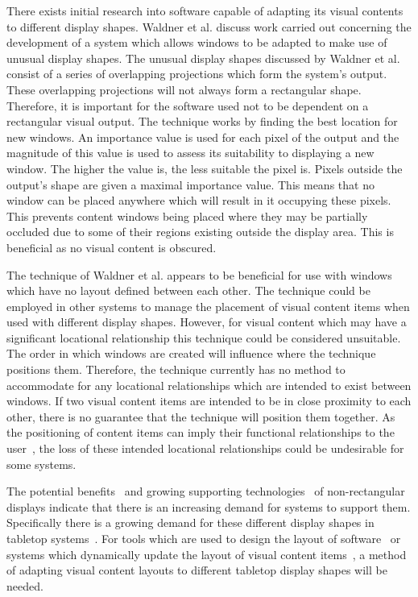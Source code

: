 \documentclass[review,5p,times,twocolumn]{elsarticle}
\begin{document}
There exists initial research into software capable of adapting its visual contents to different display shapes.
Waldner et al. \cite{Waldner2011} discuss work carried out concerning the development of a system which allows windows to be adapted to make use of unusual display shapes.
The unusual display shapes discussed by Waldner et al. consist of a series of overlapping projections which form the system's output.
These overlapping projections will not always form a rectangular shape.
Therefore, it is important for the software used not to be dependent on a rectangular visual output.
The technique works by finding the best location for new windows.
An importance value is used for each pixel of the output and the magnitude of this value is used to assess its suitability to displaying a new window.
The higher the value is, the less suitable the pixel is.
Pixels outside the output's shape are given a maximal importance value.
This means that no window can be placed anywhere which will result in it occupying these pixels.
This prevents content windows being placed where they may be partially occluded due to some of their regions existing outside the display area.
This is beneficial as no visual content is obscured.

The technique of Waldner et al. \cite{Waldner2011} appears to be beneficial for use with windows which have no layout defined between each other.
The technique could be employed in other systems to manage the placement of visual content items when used with different display shapes.
However, for visual content which may have a significant locational relationship this technique could be considered unsuitable.
The order in which windows are created will influence where the technique positions them.
Therefore, the technique currently has no method to accommodate for any locational relationships which are intended to exist between windows.
If two visual content items are intended to be in close proximity to each other, there is no guarantee that the technique will position them together.
As the positioning of content items can imply their functional relationships to the user~\cite{Constantine1999}, the loss of these intended locational relationships could be undesirable for some systems.

The potential benefits~\cite{Greenfield2006,Vernier2002} and growing supporting technologies~\cite{Boyd2007,Finney2009} of non-rectangular displays indicate that there is an increasing demand for systems to support them.
Specifically there is a growing demand for these different display shapes in tabletop systems~\cite{Hansen2009,Shen2004}.
For tools which are used to design the layout of software~\cite{Meskens2008} or systems which dynamically update the layout of visual content items~\cite{Gajos2004}, a method of adapting visual content layouts to different tabletop display shapes will be needed.
\end{document}
